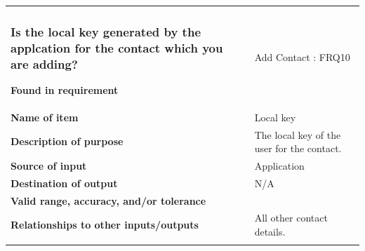 \begin{tabular}{ll}
\subsubsection{Is the local key generated by the applcation for the contact which you are adding?}
\textbf{Found in requirement}&Add Contact : FRQ10\\
\textbf{Name of item}&Local key\\
\textbf{Description of purpose}&The local key of the user for the contact.\\
\textbf{Source of input}&Application\\
\textbf{Destination of output}&N/A\\
\textbf{Valid range, accuracy, and/or tolerance}&\\
\textbf{Relationships to other inputs/outputs}&All other contact details.\\
&\\
\end{tabular}
\newpage
